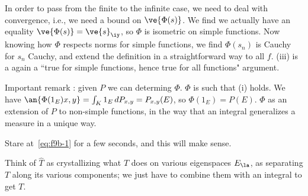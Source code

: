 In order to pass from the finite to the infinite case, we need to deal with convergence, i.e., we need a bound on $\ve{\Phi(s)}$. We find we actually have an equality $\ve{\Phi(s)}=\ve{s}_{\iy}$, so $\Phi$ is isometric on simple functions. Now knowing how $\Phi$ respects norms for simple functions, we find $\Phi(s_n)$ is Cauchy for $s_n$ Cauchy, and extend the definition in a straightforward way to all $f$. (iii) is a again a ``true for simple functions, hence true for all functions" argument.

Important remark : given $P$ we can determing $\Phi$. $\Phi$ is such that (i) holds. We have $\an{\Phi(1_E)x,y}=\int_K1_E\,dP_{x,y}=P_{x,y}(E)$, so $\Phi(1_E)=P(E)$. $\Phi$ as an extension of $P$ to non-simple functions, in the way that an integral generalizes a measure in a unique way.

 Stare at~\eqref{eq:f9b-1} for a few seconds, and this will make sense. 

Think of $\hat T$ as crystallizing what $T$ does on various eigenspaces $E_{\la}$, as separating $T$ along its various components; we just have to combine them with an integral to get $T$. %

